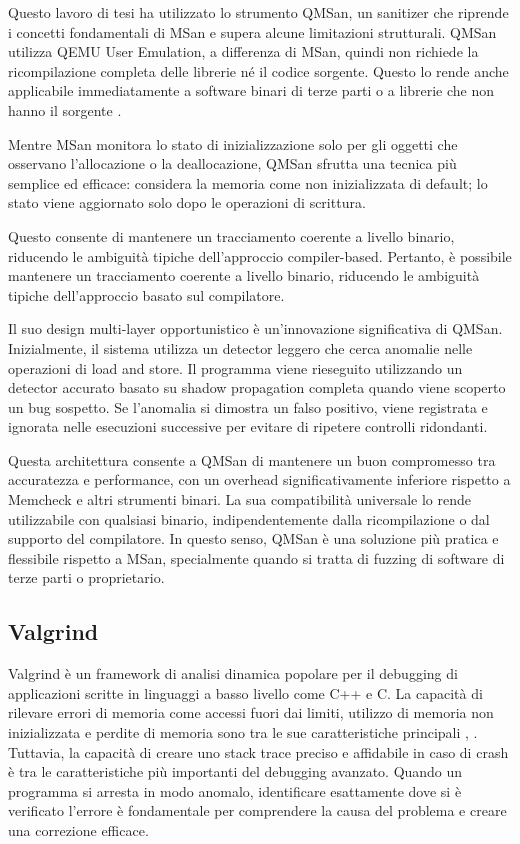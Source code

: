 Questo lavoro di tesi ha utilizzato lo strumento QMSan, un sanitizer che riprende i concetti fondamentali di MSan e supera alcune limitazioni strutturali. QMSan utilizza QEMU User Emulation, a differenza di MSan, quindi non richiede la ricompilazione completa delle librerie né il codice sorgente. Questo lo rende anche applicabile immediatamente a software binari di terze parti o a librerie che non hanno il sorgente \cite{ref12}.

Mentre MSan monitora lo stato di inizializzazione solo per gli oggetti che osservano l'allocazione o la deallocazione, QMSan sfrutta una tecnica più semplice ed efficace: considera la memoria come non inizializzata di default; lo stato viene aggiornato solo dopo le operazioni di scrittura. 

Questo consente di mantenere un tracciamento coerente a livello binario, riducendo le ambiguità tipiche dell’approccio compiler-based. Pertanto, è possibile mantenere un tracciamento coerente a livello binario, riducendo le ambiguità tipiche dell'approccio basato sul compilatore.

Il suo design multi-layer opportunistico è un'innovazione significativa di QMSan. Inizialmente, il sistema utilizza un detector leggero che cerca anomalie nelle operazioni di load and store. Il programma viene rieseguito utilizzando un detector accurato basato su shadow propagation completa quando viene scoperto un bug sospetto. Se l'anomalia si dimostra un falso positivo, viene registrata e ignorata nelle esecuzioni successive per evitare di ripetere controlli ridondanti.

Questa architettura consente a QMSan di mantenere un buon compromesso tra accuratezza e performance, con un overhead significativamente inferiore rispetto a Memcheck e altri strumenti binari. La sua compatibilità universale lo rende utilizzabile con qualsiasi binario, indipendentemente dalla ricompilazione o dal supporto del compilatore. In questo senso, QMSan è una soluzione più pratica e flessibile rispetto a MSan, specialmente quando si tratta di fuzzing di software di terze parti o proprietario.

\subsection{Valgrind}

Valgrind è un framework di analisi dinamica popolare per il debugging di applicazioni scritte in linguaggi a basso livello come C++ e C. La capacità di rilevare errori di memoria come accessi fuori dai limiti, utilizzo di memoria non inizializzata e perdite di memoria sono tra le sue caratteristiche principali \cite{ref14}, \cite{ref15}. Tuttavia, la capacità di creare uno stack trace preciso e affidabile in caso di crash è tra le caratteristiche più importanti del debugging avanzato. Quando un programma si arresta in modo anomalo, identificare esattamente dove si è verificato l'errore è fondamentale per comprendere la causa del problema e creare una correzione efficace.

